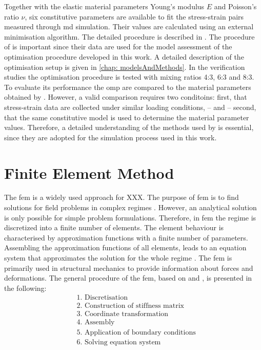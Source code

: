 Together with the elastic material parameters Young's modulus $E$ and Poisson's ratio $\nu$, six constitutive parameters are available to fit the stress-strain pairs measured through \acrshort{md} simulation. Their values are calculated using an external minimisation algorithm. The detailed procedure is described in \cite{ries_deciphering_nodate}. The procedure of \citet{ries_deciphering_nodate} is important since their data are used for the model assessment of the optimisation procedure developed in this work. A detailed description of the optimisation setup is given in \autoref{chap: modelsAndMethods}. In the verification studies the optimisation procedure is tested with mixing ratios 4:3, 6:3 and 8:3. To evaluate its performance the \acrlong{omp} are compared to the material parameters obtained by \citet{ries_deciphering_nodate}. However, a valid comparison requires two conditoins: first, that stress-strain data are collected under similar loading conditions, – and – second, that the same constitutive model is used to determine the material parameter values. Therefore, a detailed understanding of the methods used by \citet{ries_deciphering_nodate} is essential, since they are adopted for the simulation process used in this work.  



\section{Finite Element Method} \label{sec: FEMBasics}

The \acrfull{fem} is a widely used approach for XXX. 
The purpose of \acrshort{fem} is to find solutions for field problems in complex regimes \cite{willner_vorlesungsskript_nodate}. However, an analytical solution is only possible for simple problem formulations. Therefore, in \acrshort{fem} the regime is discretized into a finite number of elements. The element behaviour is characterised by approximation functions with a finite number of parameters. Assembling the approximation functions of all elements, leads to an equation system that approximates the solution for the whole regime \cite{jagota_finite_nodate}. The \acrshort{fem} is primarily used in structural mechanics to provide information about forces and deformations. The general procedure of the \acrshort{fem}, based on \citet{willner_vorlesungsskript_nodate} and \citet{steinke_finite-elemente-methode_2015}, is presented in the following: 
\begin{align*}
    &\text{1. Discretisation} \\
    &\text{2. Construction of stiffness matrix}\\ 
    &\text{3. Coordinate transformation} \\
    &\text{4. Assembly} \\
    &\text{5. Application of boundary conditions} \\
    &\text{6. Solving equation system}
\end{align*}

